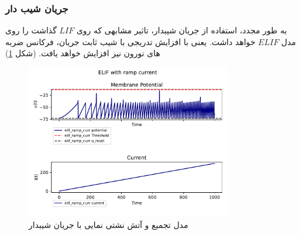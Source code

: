 \documentclass{article}
\begin{document}
            \subsubsection{جریان شیب دار}
                به طور مجدد، استفاده از جریان شیبدار، تاثیر مشابهی که روی 
                $LIF$ 
                گذاشت را روی مدل 
                $ELIF$ 
                خواهد داشت. یعنی با افزایش تدریجی با شیب ثابت جریان، فرکانس ضربه های نورون نیز افزایش خواهد یافت.
                (شکل \ref{fig:elif-ramp-curr})
                \begin{figure}[H]
                    \centering
                    \includegraphics[width=0.8\textwidth]{plots/ELIF with ramp current.pdf} 
                    \caption{مدل تجمیع و آتش نشتی نمایی با جریان شیبدار}
                    \label{fig:elif-ramp-curr}
                \end{figure}
\end{document}
